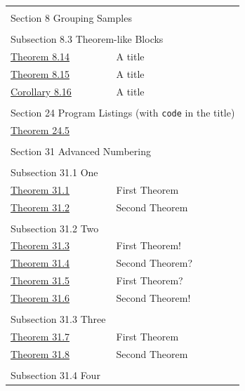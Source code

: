 \documentclass[pdflatex]{sn-jnl}
\theoremstyle{thmstyleone}%
\theoremstyle{thmstyletwo}%
\theoremstyle{thmstylethree}%
\newcommand{\mono}[1]{\texttt{#1}}
\numberwithin{equation}{section}
\begin{document}
\begin{appendices}
\begin{longtable}[l]{ll}
\multicolumn{2}{l}{\null}\\[1.5ex] \multicolumn{2}{l}{\large Section 8 Grouping Samples}\\[0.5ex]
\multicolumn{2}{l}{\null}\\[1.5ex] \multicolumn{2}{l}{\large Subsection 8.3 Theorem-like Blocks}\\[0.5ex]
\hyperref[block-samples-theorem-like-2]{Theorem 8.14}& A title\\
\hyperref[block-samples-theorem-like-3]{Theorem 8.15}& A title\\
\hyperref[block-samples-theorem-like-4]{Corollary 8.16}& A title\\
\multicolumn{2}{l}{\null}\\[1.5ex] \multicolumn{2}{l}{\large Section 24 Program Listings (with \mono{code} in the title)}\\[0.5ex]
\hyperref[theorem-detached]{Theorem 24.5}& \\
\multicolumn{2}{l}{\null}\\[1.5ex] \multicolumn{2}{l}{\large Section 31 Advanced Numbering}\\[0.5ex]
\multicolumn{2}{l}{\null}\\[1.5ex] \multicolumn{2}{l}{\large Subsection 31.1 One}\\[0.5ex]
\hyperref[theorem-number-01]{Theorem 31.1}& First Theorem\\
\hyperref[theorem-number-02]{Theorem 31.2}& Second Theorem\\
\multicolumn{2}{l}{\null}\\[1.5ex] \multicolumn{2}{l}{\large Subsection 31.2 Two}\\[0.5ex]
\hyperref[theorem-number-03]{Theorem 31.3}& First Theorem!\\
\hyperref[theorem-number-04]{Theorem 31.4}& Second Theorem?\\
\hyperref[theorem-number-05]{Theorem 31.5}& First Theorem?\\
\hyperref[theorem-number-06]{Theorem 31.6}& Second Theorem!\\
\multicolumn{2}{l}{\null}\\[1.5ex] \multicolumn{2}{l}{\large Subsection 31.3 Three}\\[0.5ex]
\hyperref[theorem-number-07]{Theorem 31.7}& First Theorem\\
\hyperref[theorem-number-08]{Theorem 31.8}& Second Theorem\\
\multicolumn{2}{l}{\null}\\[1.5ex] \multicolumn{2}{l}{\large Subsection 31.4 Four}\\[0.5ex]

\end{longtable}
\end{appendices}
\end{document}
